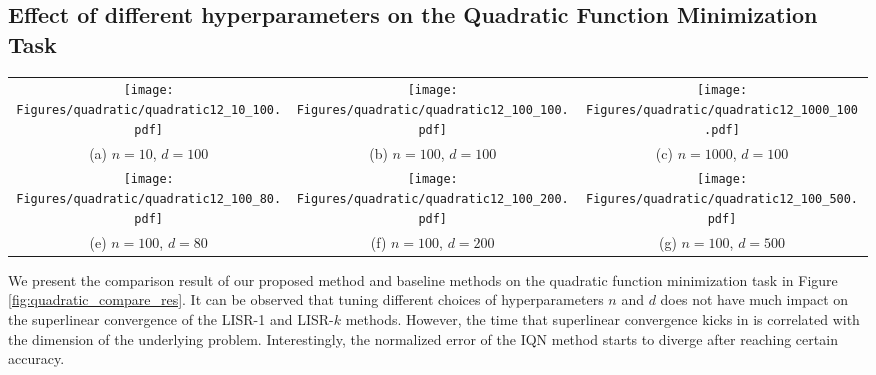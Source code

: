 \documentclass[letterpaper]{article} %
\theoremstyle{plain}
\theoremstyle{definition}
\theoremstyle{remark}
\begin{document}
\subsection{Effect of different hyperparameters on the Quadratic Function Minimization Task}
\begin{figure*}[!tb]
\centering
\begin{tabular}{ccc}
     \texttt{[image: Figures/quadratic/quadratic12\_10\_100.pdf]}
     & \texttt{[image: Figures/quadratic/quadratic12\_100\_100.pdf]}
     & \texttt{[image: Figures/quadratic/quadratic12\_1000\_100.pdf]} \\
     (a) $n=10$, $d=100$ & (b) $n=100$, $d=100$ &  (c) $n=1000$, $d=100$ \\
     \texttt{[image: Figures/quadratic/quadratic12\_100\_80.pdf]}
     & \texttt{[image: Figures/quadratic/quadratic12\_100\_200.pdf]}
     & \texttt{[image: Figures/quadratic/quadratic12\_100\_500.pdf]} \\   
     (e) $n=100$, $d=80$ & (f) $n=100$, $d=200$ &  (g) $n=100$, $d=500$ \\
\end{tabular}
\caption{Comparison of the proposed methods with baselines for the quadratic function minimization problem. }
\label{fig:quadratic_compare_res}
\end{figure*}

We present the comparison result of our proposed method and baseline methods on the quadratic function minimization task in Figure \ref{fig:quadratic_compare_res}.
It can be observed that tuning different choices of hyperparameters $n$ and $d$ does not have much impact on the superlinear convergence of the LISR-1 and LISR-$k$ methods.
However, the time that superlinear convergence kicks in is correlated with the dimension of the underlying problem. 
Interestingly, the normalized error of the IQN method starts to diverge after reaching certain accuracy.
\end{document}
